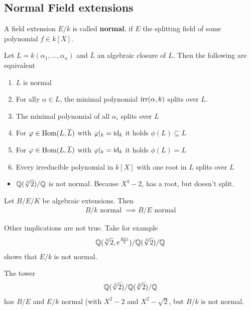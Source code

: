 \subsection{Normal Field extensions}


\begin{dfn}[]
  A field extension $E/k$ is called \textbf{normal}, if $E$ the splitting field of some polynomial $f \in  k[X]$.
\end{dfn}

\begin{prop}[]
  Let $L = k(\alpha_{1}, \ldots, \alpha_{n})$ and $\overline{L}$ an algebraic closure of $L$.
  Then the following are equivalent
  \begin{enumerate}
    \item $L$ is normal
    \item For ally $\alpha \in L$, the minimal polynomial $\operatorname{irr}(\alpha,k)$ splits over $L$.
    \item The minimal polynomial of all $\alpha_i$ splits over $L$
    \item For $\varphi \in \operatorname{Hom}(L,\overline{L})$ with $\varphi|_k = \operatorname{id}_k$ it holds $\phi(L) \subseteq L$
    \item For $\varphi \in \operatorname{Hom}(L,\overline{L})$ with $\varphi|_k = \operatorname{id}_k$ it holds $\phi(L) = L$
    \item Every irreducible polynomial in $k[X]$ with one root in $L$ splits over $L$
  \end{enumerate}
\end{prop}

\begin{itemize}
  \item $\mathbb{Q}(\sqrt[3]{2})/\mathbb{Q}$ is not normal. Because $X^{3} -2$, has a root, but doesn't split.
\end{itemize}


\begin{prop}[]
Let $B/E/K$ be algebraic extensions. Then
\begin{align*}
  B/k \text{ normal } \implies B/E \text{ normal}
\end{align*}
\end{prop}
Other implications are not true. Take for example
\begin{align*}
  \mathbb{Q}(\sqrt[3]{2},e^{\frac{2 \pi i}{3}})/\mathbb{Q}(\sqrt[3]{2})/\mathbb{Q}
\end{align*}
shows that $E/k$ is not normal.

The tower
\begin{align*}
  \mathbb{Q}(\sqrt[4]{2})/\mathbb{Q}(\sqrt[2]{2})/\mathbb{Q}
\end{align*}
has $B/E$ and $E/k$ normal (with $X^{2} -2$ and $X^{2} - \sqrt{2}$, but $B/k$ is not normal.



